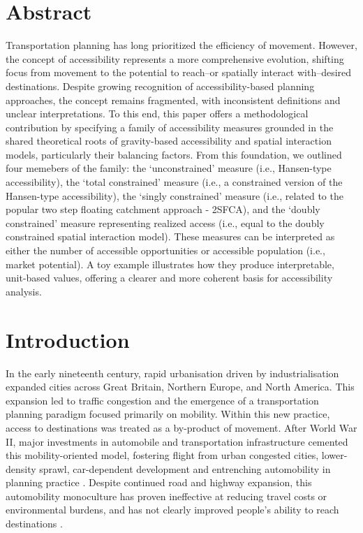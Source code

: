 \documentclass[
  10pt,
  letterpaper,
]{article}
\begin{document}
\section*{Abstract}
Transportation planning has long prioritized the efficiency of movement.
However, the concept of accessibility represents a more comprehensive
evolution, shifting focus from movement to the potential to reach--or
spatially interact with--desired destinations. Despite growing
recognition of accessibility-based planning approaches, the concept
remains fragmented, with inconsistent definitions and unclear
interpretations. To this end, this paper offers a methodological
contribution by specifying a family of accessibility measures grounded
in the shared theoretical roots of gravity-based accessibility and
spatial interaction models, particularly their balancing factors. From
this foundation, we outlined four memebers of the family: the
`unconstrained' measure (i.e., Hansen-type accessibility), the `total
constrained' measure (i.e., a constrained version of the Hansen-type
accessibility), the `singly constrained' measure (i.e., related to the
popular two step floating catchment approach - 2SFCA), and the `doubly
constrained' measure representing realized access (i.e., equal to the
doubly constrained spatial interaction model). These measures can be
interpreted as either the number of accessible opportunities or
accessible population (i.e., market potential). A toy example
illustrates how they produce interpretable, unit-based values, offering
a clearer and more coherent basis for accessibility analysis.


\linenumbers
\section{Introduction}\label{introduction}

In the early nineteenth century, rapid urbanisation driven by
industrialisation expanded cities across Great Britain, Northern Europe,
and North America. This expansion led to traffic congestion and the
emergence of a transportation planning paradigm focused primarily on
mobility. Within this new practice, access to destinations was treated
as a by-product of movement. After World War II, major investments in
automobile and transportation infrastructure cemented this
mobility-oriented model, fostering flight from urban congested cities,
lower-density sprawl, car-dependent development and entrenching
automobility in planning practice
\citep{miller_collaborative_2011, lavery_driving_2013}. Despite
continued road and highway expansion, this automobility monoculture has
proven ineffective at reducing travel costs or environmental burdens,
and has not clearly improved people's ability to reach destinations
\citep{farber_running_2011, handyACCESSIBILITYVSMOBILITYENHANCING2002, paez_healthcare_2010}.
\end{document}

